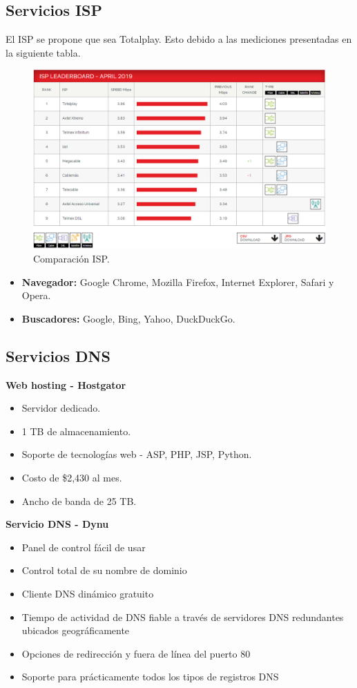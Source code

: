 \documentclass[12pt,letterpaper]{article}
\begin{document}
\subsection{Servicios ISP}
El ISP se propone que sea Totalplay. Esto debido a las mediciones presentadas en la siguiente 
tabla.
\begin{figure}[ht]
    \centering
    \includegraphics[width=1\textwidth]{imagenes/isp.png}
    \caption{Comparación ISP.}
\end{figure}

\begin{itemize}
    \item \textbf{Navegador: }Google Chrome, Mozilla Firefox, Internet Explorer, Safari 
    y Opera. 
    \item \textbf{Buscadores: }Google, Bing, Yahoo, DuckDuckGo.
\end{itemize}

\subsection{Servicios DNS}
\textbf{Web hosting - Hostgator}
\begin{itemize}
    \item Servidor dedicado.
    \item 1 TB de almacenamiento.
    \item Soporte de tecnologías web - ASP, PHP, JSP, Python.
    \item Costo de \$2,430 al mes.
    \item Ancho de banda de 25 TB.
\end{itemize}

\textbf{Servicio DNS - Dynu}
\begin{itemize}
    \item Panel de control fácil de usar
    \item Control total de su nombre de dominio
    \item Cliente DNS dinámico gratuito
    \item Tiempo de actividad de DNS fiable a través de servidores DNS redundantes ubicados geográficamente
    \item Opciones de redirección y fuera de línea del puerto 80
    \item Soporte para prácticamente todos los tipos de registros DNS
\end{itemize}
\end{document}
